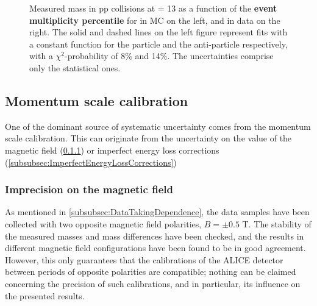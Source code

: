 \begin{figure}[h]
\hspace*{-1.5cm}
\caption{Measured mass in pp collisions at \sqrtS = 13 \tev as a function of the \textbf{event multiplicity percentile} for \rmLambda in MC on the left, and in data on the right. The solid and dashed lines on the left figure represent fits with a constant function for the particle and the anti-particle respectively, with a $\chi^{2}$-probability of 8\% and 14\%. The uncertainties comprise only the statistical ones.}
	\label{fig:MassVsMult}
\end{figure}

\subsection{Momentum scale calibration}

One of the dominant source of systematic uncertainty comes from the momentum scale calibration. This can originate from the uncertainty on the value of the magnetic field (\Sec\ref{subsubsec:ImprecisionMagneticField}) or imperfect energy loss corrections (\Sec\ref{subsubsec:ImperfectEnergyLossCorrections})

\subsubsection{Imprecision on the magnetic field}
\label{subsubsec:ImprecisionMagneticField}

As mentioned in \Sec\ref{subsubsec:DataTakingDependence}, the data samples have been collected with two opposite magnetic field polarities, $B = \pm 0.5$ T. The stability of the measured masses and mass differences have been checked, and the results in different magnetic field configurations have been found to be in good agreement. However, this only guarantees that the calibrations of the ALICE detector between periods of opposite polarities are compatible; nothing can be claimed concerning the precision of such calibrations, and in particular, its influence on the presented results.\\


